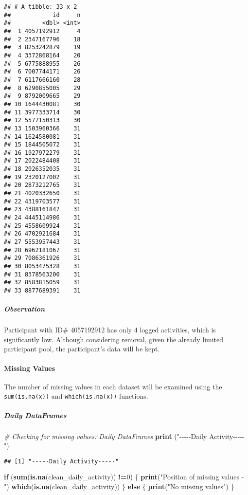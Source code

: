 \documentclass[
]{article}
\newenvironment{Shaded}{\begin{snugshade}}{\end{snugshade}}
\newcommand{\CommentTok}[1]{\textcolor[rgb]{0.56,0.35,0.01}{\textit{#1}}}
\newcommand{\ControlFlowTok}[1]{\textcolor[rgb]{0.13,0.29,0.53}{\textbf{#1}}}
\newcommand{\DecValTok}[1]{\textcolor[rgb]{0.00,0.00,0.81}{#1}}
\newcommand{\FunctionTok}[1]{\textcolor[rgb]{0.13,0.29,0.53}{\textbf{#1}}}
\newcommand{\NormalTok}[1]{#1}
\newcommand{\SpecialCharTok}[1]{\textcolor[rgb]{0.81,0.36,0.00}{\textbf{#1}}}
\newcommand{\StringTok}[1]{\textcolor[rgb]{0.31,0.60,0.02}{#1}}
\begin{document}
\begin{verbatim}
## # A tibble: 33 x 2
##            id     n
##         <dbl> <int>
##  1 4057192912     4
##  2 2347167796    18
##  3 8253242879    19
##  4 3372868164    20
##  5 6775888955    26
##  6 7007744171    26
##  7 6117666160    28
##  8 6290855005    29
##  9 8792009665    29
## 10 1644430081    30
## 11 3977333714    30
## 12 5577150313    30
## 13 1503960366    31
## 14 1624580081    31
## 15 1844505072    31
## 16 1927972279    31
## 17 2022484408    31
## 18 2026352035    31
## 19 2320127002    31
## 20 2873212765    31
## 21 4020332650    31
## 22 4319703577    31
## 23 4388161847    31
## 24 4445114986    31
## 25 4558609924    31
## 26 4702921684    31
## 27 5553957443    31
## 28 6962181067    31
## 29 7086361926    31
## 30 8053475328    31
## 31 8378563200    31
## 32 8583815059    31
## 33 8877689391    31
\end{verbatim}

\hypertarget{observation-2}{%
\subparagraph{Observation}\label{observation-2}}

Participant with ID\# 4057192912 has only 4 logged activities, which is
significantly low. Although considering removal, given the already
limited participant pool, the participant's data will be kept.

\hypertarget{missing-values}{%
\paragraph{Missing Values}\label{missing-values}}

The number of missing values in each dataset will be examined using the
\texttt{sum(is.na(x))} and \texttt{which(is.na(x))} functions.

\hypertarget{daily-dataframes-4}{%
\subparagraph{Daily DataFrames}\label{daily-dataframes-4}}

\begin{Shaded}
\begin{Highlighting}[]
\CommentTok{\# Checking for missing values: Daily DataFrames}
\FunctionTok{print}\NormalTok{ (}\StringTok{"{-}{-}{-}{-}{-}Daily Activity{-}{-}{-}{-}{-}"}\NormalTok{)}
\end{Highlighting}
\end{Shaded}

\begin{verbatim}
## [1] "-----Daily Activity-----"
\end{verbatim}

\begin{Shaded}
\begin{Highlighting}[]
\ControlFlowTok{if}\NormalTok{ (}\FunctionTok{sum}\NormalTok{(}\FunctionTok{is.na}\NormalTok{(clean\_daily\_activity)) }\SpecialCharTok{!=}\DecValTok{0}\NormalTok{) \{}
  \FunctionTok{print}\NormalTok{(}\StringTok{"Position of missing values {-} "}\NormalTok{)}
  \FunctionTok{which}\NormalTok{(}\FunctionTok{is.na}\NormalTok{(clean\_daily\_activity))}
\NormalTok{\} }\ControlFlowTok{else}\NormalTok{ \{}
  \FunctionTok{print}\NormalTok{(}\StringTok{"No missing values"}\NormalTok{)}
\NormalTok{\}}
\end{Highlighting}
\end{Shaded}
\end{document}
